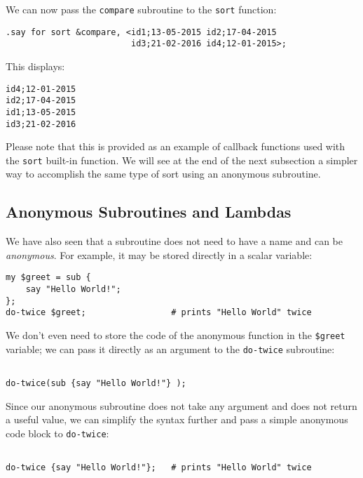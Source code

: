 We can now pass the {\tt compare} subroutine to the 
{\tt sort} function:
\begin{verbatim}
.say for sort &compare, <id1;13-05-2015 id2;17-04-2015 
                         id3;21-02-2016 id4;12-01-2015>;
\end{verbatim}

This displays:
\begin{verbatim}
id4;12-01-2015
id2;17-04-2015
id1;13-05-2015
id3;21-02-2016
\end{verbatim}

Please note that this is provided as an example of callback 
functions used with the {\tt sort} built-in function. We will 
see at the end of the next subsection a simpler way to accomplish 
the same type of sort using an anonymous subroutine. 

\subsection{Anonymous Subroutines and Lambdas}

We have also seen that a subroutine does not need to 
have a name and can be \emph{anonymous}. For example, 
it may be stored directly in a scalar variable:

\begin{verbatim}
my $greet = sub {
    say "Hello World!";
};
do-twice $greet;                 # prints "Hello World" twice
\end{verbatim}

We don't even need to store the code of the anonymous function 
in the \verb'$greet' variable; we can pass it directly as an 
argument to the {\tt do-twice} subroutine:

\begin{verbatim}

do-twice(sub {say "Hello World!"} );
\end{verbatim}

Since our anonymous subroutine does not take any argument 
and does not return a useful value, we can simplify the 
syntax further and pass a simple anonymous code block 
to {\tt do-twice}:

\begin{verbatim}

do-twice {say "Hello World!"};   # prints "Hello World" twice
\end{verbatim}

